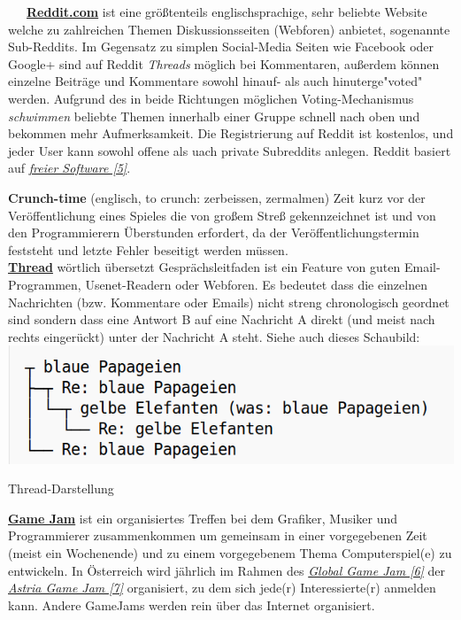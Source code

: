 ~~~\href{http://reddit.com}{\textbf{Reddit.com}} ist eine größtenteils englischsprachige, sehr beliebte Website welche zu zahlreichen Themen Diskussionsseiten (Webforen) anbietet, sogenannte Sub-Reddits. Im Gegensatz zu simplen Social-Media Seiten wie Facebook oder Google+ sind auf Reddit \textit{Threads} möglich bei Kommentaren, außerdem können einzelne Beiträge und Kommentare sowohl hinauf- als auch hinuterge"voted" werden. Aufgrund des in beide Richtungen möglichen Voting-Mechanismus \textit{schwimmen} beliebte Themen innerhalb einer Gruppe schnell nach oben und bekommen mehr Aufmerksamkeit. Die Registrierung auf Reddit ist kostenlos, und jeder User kann sowohl offene als uach private Subreddits anlegen. Reddit basiert auf \href{http://github.com/reddit/}{\textit{freier Software [5]}}.

\textbf{Crunch-time} (englisch, to crunch: zerbeissen, zermalmen) Zeit kurz vor der Veröffentlichung eines Spieles die von großem Streß gekennzeichnet ist und von den Programmierern Überstunden erfordert, da der Veröffentlichungstermin feststeht und letzte Fehler beseitigt werden müssen.\\

\href{http://de.wikipedia.org/wiki/Thread_(Internet)}{\textbf{Thread}} wörtlich übersetzt Gesprächsleitfaden ist ein Feature von guten Email-Programmen, Usenet-Readern oder Webforen. Es bedeutet dass die einzelnen Nachrichten (bzw. Kommentare oder Emails) nicht streng chronologisch geordnet sind sondern dass eine Antwort B auf eine Nachricht A direkt (und meist nach rechts eingerückt) unter der Nachricht A steht. Siehe auch dieses Schaubild:
\includegraphics[width=\linewidth]{redditrant/redditrant-threads.png} \\
\begin{center}
\footnotesize{Thread-Darstellung}
\end{center}

\href{https://en.wikipedia.org/wiki/Game_jam}{\textbf{Game Jam}} ist ein organisiertes Treffen bei dem Grafiker, Musiker und Programmierer zusammenkommen um gemeinsam in einer vorgegebenen Zeit (meist ein Wochenende) und zu einem vorgegebenem Thema Computerspiel(e) zu entwickeln. In Österreich wird jährlich im Rahmen des \href{http://globalgamejam.org/}{\textit{Global Game Jam [6]}} der \href{http://austriagamejam.org/}{\textit{Astria Game Jam [7]}} organisiert, zu dem sich jede(r) Interessierte(r) anmelden kann. Andere GameJams werden rein über das Internet organisiert. 

